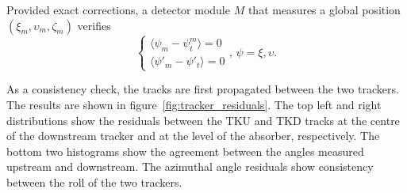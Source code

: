 Provided exact corrections, a detector module $M$ that measures a global position $(\xi_m,\upsilon_m,\zeta_m)$ verifies
\begin{equation}
\left\{
\begin{array}{l}
\langle \psi_m-\psi_t^m\rangle=0 \\
\langle \psi'_m-\psi'_t\rangle=0
\end{array}
\right.,\,\psi=\xi,\upsilon.
\end{equation}

As a consistency check, the tracks are first propagated between the two trackers. The results are shown in figure~\ref{fig:tracker_residuals}. The top left and right distributions show the residuals between the TKU and TKD tracks at the centre of the downstream tracker and at the level of the absorber, respectively. The bottom two histograms show the agreement between the angles measured upstream and downstream. The azimuthal angle residuals show consistency between the roll of the two trackers.

